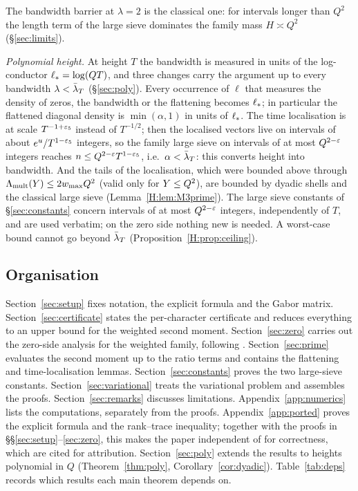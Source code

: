 \documentclass[11pt]{amsart}
\theoremstyle{definition}
\theoremstyle{remark}
\numberwithin{equation}{section}
\begin{document}
The bandwidth barrier at $\lambda=2$ is the classical one: for intervals longer than $Q^2$ the length term of the large sieve dominates the family mass $H\asymp Q^2$ (\S\ref{sec:limits}).

\emph{Polynomial height.} At height $T$ the bandwidth is measured in units of the log-conductor $\ell_*=\log(QT)$, and three changes carry the argument up to every bandwidth $\lambda<\bar\lambda_T$ (\S\ref{sec:poly}). Every occurrence of $\ell$ that measures the density of zeros, the bandwidth or the flattening becomes $\ell_*$; in particular the flattened diagonal density is $\min(\alpha,1)$ in units of $\ell_*$. The time localisation is at scale $T^{-1+\varepsilon_5}$ instead of $T^{-1/2}$; then the localised vectors live on intervals of about $e^u/T^{1-\varepsilon_5}$ integers, so the family large sieve on intervals of at most $Q^{2-\varepsilon}$ integers reaches $n\le Q^{2-\varepsilon}T^{1-\varepsilon_5}$, i.e.\ $\alpha<\bar\lambda_T$: this converts height into bandwidth. And the tails of the localisation, which were bounded above through $\Lambda_{\mathrm{mult}}(Y)\le2w_{\max} Q^2$ (valid only for $Y\le Q^2$), are bounded by dyadic shells and the classical large sieve (Lemma~\ref{H:lem:M3prime}). The large sieve constants of \S\ref{sec:constants} concern intervals of at most $Q^{2-\varepsilon}$ integers, independently of $T$, and are used verbatim; on the zero side nothing new is needed. A worst-case bound cannot go beyond $\bar\lambda_T$ (Proposition~\ref{H:prop:ceiling}).

\subsection{Organisation}
Section~\ref{sec:setup} fixes notation, the explicit formula and the Gabor matrix. Section~\ref{sec:certificate} states the per-character certificate and reduces everything to an upper bound for the weighted second moment. Section~\ref{sec:zero} carries out the zero-side analysis for the weighted family, following \cite{HY26}. Section~\ref{sec:prime} evaluates the second moment up to the ratio terms and contains the flattening and time-localisation lemmas. Section~\ref{sec:constants} proves the two large-sieve constants. Section~\ref{sec:variational} treats the variational problem and assembles the proofs. Section~\ref{sec:remarks} discusses limitations. Appendix~\ref{app:numerics} lists the computations, separately from the proofs. Appendix~\ref{app:ported} proves the explicit formula and the rank--trace inequality; together with the proofs in \S\S\ref{sec:setup}--\ref{sec:zero}, this makes the paper independent of \cite{AF26,HY26} for correctness, which are cited for attribution. Section~\ref{sec:poly} extends the results to heights polynomial in $Q$ (Theorem~\ref{thm:poly}, Corollary~\ref{cor:dyadic}). Table~\ref{tab:deps} records which results each main theorem depends on.
\end{document}
